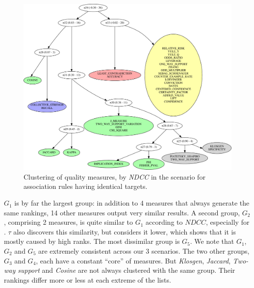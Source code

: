 \begin{figure}[th!]
  \begin{center}
  \includegraphics[width=\textwidth]{svg/rankingcom/patterns_demo-perTarget-NDCG.pdf}
  \caption{Clustering of quality measures,
    by {\em NDCC} in the \demoassoc scenario for association rules having identical targets.
    \label{fig:capa:dendogram:identical}}
  \end{center}
\end{figure}


$G_1$ is by far the largest group: in addition to 4 measures that always generate the same rankings,
14 other measures output very similar results.
A second group, $G_2$, comprising 2 measures, is quite similar to $G_1$ according to $\mathit{NDCC}$,
especially for \prodassocclient.
$\tau$ also discovers this similarity, but considers it lower,
which shows that it is mostly caused by high ranks.
The most dissimilar group is $G_5$.
We note that $G_1$, $G_2$ and $G_5$ are extremely consistent across our 3 scenarios.
The two other groups, $G_3$ and $G_4$,
each have a constant ``core'' of measures.
But {\em Klosgen}, {\em Jaccard}, {\em Two-way support} and {\em Cosine} are not
always clustered with the same group.
Their rankings differ more or less at each extreme of the lists.

%





